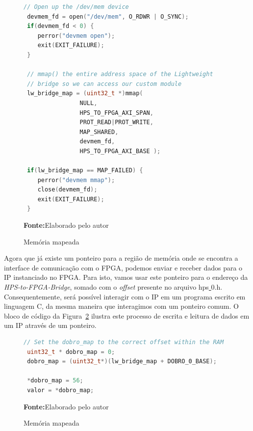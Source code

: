 \begin{figure}[ht]
\caption{Memória mapeada}
\begin{center}
\begin{lstlisting}[language=C++, backgroundcolor=\color{gray!10}]
 // Open up the /dev/mem device
 devmem_fd = open("/dev/mem", O_RDWR | O_SYNC);
 if(devmem_fd < 0) {
	perror("devmem open"); 
	exit(EXIT_FAILURE);
 }	

 // mmap() the entire address space of the Lightweight 
 // bridge so we can access our custom module 
 lw_bridge_map = (uint32_t *)mmap( 
				NULL, 
				HPS_TO_FPGA_AXI_SPAN, 
				PROT_READ|PROT_WRITE, 
				MAP_SHARED, 
				devmem_fd, 
				HPS_TO_FPGA_AXI_BASE ); 
				
 if(lw_bridge_map == MAP_FAILED) {
	perror("devmem mmap");
	close(devmem_fd);
	exit(EXIT_FAILURE);
 }
\end{lstlisting}
{\small \textbf{Fonte:}Elaborado pelo autor}	
\end{center}\label{fig:codigomap}
\end{figure} 

Agora que já existe um ponteiro para a região de memória onde se encontra a interface de comunicação com o FPGA, podemos enviar e receber dados para o IP instanciado no FPGA\@. Para isto, vamos usar este ponteiro para o endereço da \textit{HPS-to-FPGA-Bridge}, somado com o \textit{offset} presente no arquivo hps\underline{ }0.h.  Consequentemente, será possível interagir com o IP em um programa escrito em linguagem C, da mesma maneira que interagimos com um ponteiro comum. O bloco de código da Figura~\ref{fig:codigomapdobro} ilustra este processo de escrita e leitura de dados em um IP através de um ponteiro.

\begin{figure}[ht]
\caption{Memória mapeada}
\begin{center}
\begin{lstlisting}[language=C++, backgroundcolor=\color{gray!10}]
 // Set the dobro_map to the correct offset within the RAM
 uint32_t * dobro_map = 0;
 dobro_map = (uint32_t*)(lw_bridge_map + DOBRO_0_BASE);

 *dobro_map = 56;
 valor = *dobro_map;
\end{lstlisting}
{\small \textbf{Fonte:}Elaborado pelo autor}	
\end{center}\label{fig:codigomapdobro}
	
\end{figure}
